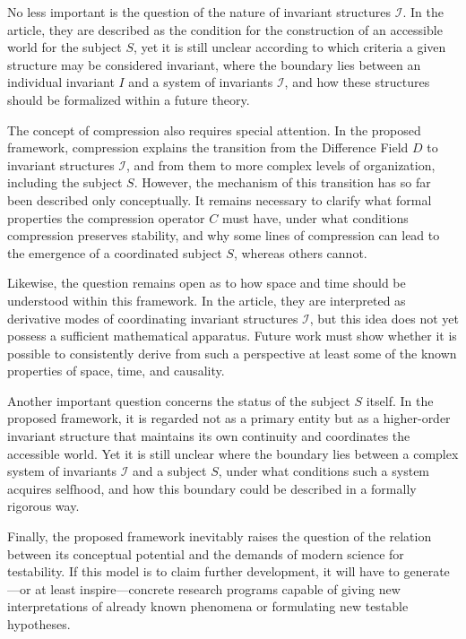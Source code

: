 \documentclass[aps,prd,onecolumn,nofootinbib,superscriptaddress]{revtex4-2}
\begin{document}
No less important is the question of the nature of invariant structures \(\mathcal{I}\). In the article, they are described as the condition for the construction of an accessible world for the subject \(S\), yet it is still unclear according to which criteria a given structure may be considered invariant, where the boundary lies between an individual invariant \(I\) and a system of invariants \(\mathcal{I}\), and how these structures should be formalized within a future theory.

The concept of compression also requires special attention. In the proposed framework, compression explains the transition from the Difference Field \(D\) to invariant structures \(\mathcal{I}\), and from them to more complex levels of organization, including the subject \(S\). However, the mechanism of this transition has so far been described only conceptually. It remains necessary to clarify what formal properties the compression operator \(C\) must have, under what conditions compression preserves stability, and why some lines of compression can lead to the emergence of a coordinated subject \(S\), whereas others cannot.

Likewise, the question remains open as to how space and time should be understood within this framework. In the article, they are interpreted as derivative modes of coordinating invariant structures \(\mathcal{I}\), but this idea does not yet possess a sufficient mathematical apparatus. Future work must show whether it is possible to consistently derive from such a perspective at least some of the known properties of space, time, and causality.

Another important question concerns the status of the subject \(S\) itself. In the proposed framework, it is regarded not as a primary entity but as a higher-order invariant structure that maintains its own continuity and coordinates the accessible world. Yet it is still unclear where the boundary lies between a complex system of invariants \(\mathcal{I}\) and a subject \(S\), under what conditions such a system acquires selfhood, and how this boundary could be described in a formally rigorous way.

Finally, the proposed framework inevitably raises the question of the relation between its conceptual potential and the demands of modern science for testability. If this model is to claim further development, it will have to generate—or at least inspire—concrete research programs capable of giving new interpretations of already known phenomena or formulating new testable hypotheses.
\end{document}
